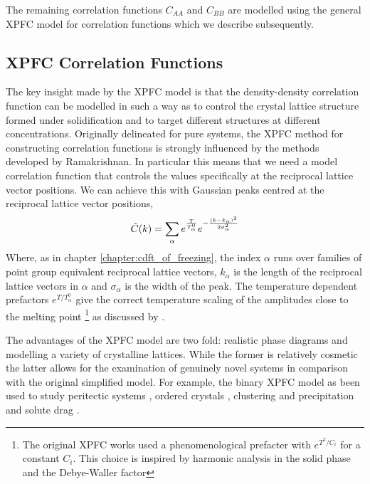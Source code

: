 The remaining correlation functions $C_{AA}$ and $C_{BB}$ are modelled
using the general XPFC model for correlation functions which we describe
subsequently.

\subsection{XPFC Correlation Functions} %

The key insight made by the XPFC model is that the density-density
correlation function can be modelled in such a way as to control the crystal
lattice structure formed under solidification and to target different structures at
different concentrations.  Originally delineated for pure systems, the XPFC
method for constructing correlation functions is strongly influenced by the
methods developed by Ramakrishnan. In particular this means that we need a
model correlation function that controls the values specifically at the
reciprocal lattice vector positions. We can achieve this with Gaussian peaks
centred at the reciprocal lattice vector positions,
%
\begin{equation}
    \tilde{C}(k) = \sum_{\alpha} e^{\frac{T}{T_\alpha^0}}
        e^{ - \frac{(k - k_\alpha)^2}{2\sigma_\alpha^2}}
\end{equation}
%
Where, as in chapter \ref{chapter:cdft_of_freezing}, the index $\alpha$ runs
over families of point group equivalent reciprocal lattice vectors, $k_\alpha$
is the length of the reciprocal lattice vectors in $\alpha$ and $\sigma_\alpha$
is the width of the peak. The temperature dependent prefactors $e^{T /
T_\alpha^0}$ give the correct temperature scaling of the amplitudes close to
the melting point \footnote{The original XPFC works used a phenomenological
prefacter with $e^{T^2 / C_i}$ for a constant $C_i$. This choice is inspired by
harmonic analysis in the solid phase and the Debye-Waller factor} as discussed
by \cite{ALSTER17}.

The advantages of the XPFC model are two fold: realistic phase diagrams and
modelling a variety of crystalline lattices. While the former is relatively
cosmetic the latter allows for the examination of genuinely novel systems in
comparison with the original simplified model. For example, the binary XPFC
model as been used to study peritectic systems \cite{GREENWOOD11_BINARY}, 
ordered crystals \cite{ALSTER17}, clustering and precipitation 
\cite{FALLAH12, FALLAH13} and solute drag \cite{GREENWOOD12}.

